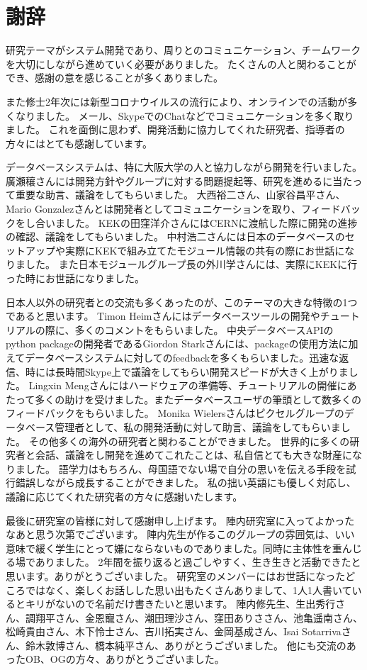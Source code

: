 
%
%
\chapter*{謝辞}
研究テーマがシステム開発であり、周りとのコミュニケーション、チームワークを大切にしながら進めていく必要がありました。
たくさんの人と関わることができ、感謝の意を感じることが多くありました。

また修士2年次には新型コロナウイルスの流行により、オンラインでの活動が多くなりました。
メール、SkypeでのChatなどでコミュニケーションを多く取りました。
これを面倒に思わず、開発活動に協力してくれた研究者、指導者の方々にはとても感謝しています。

データベースシステムは、特に大阪大学の人と協力しながら開発を行いました。
廣瀬穰さんには開発方針やグループに対する問題提起等、研究を進めるに当たって重要な助言、議論をしてもらいました。
大西裕二さん、山家谷昌平さん、Mario Gonzalezさんとは開発者としてコミュニケーションを取り、フィードバックをし合いました。
KEKの田窪洋介さんにはCERNに渡航した際に開発の進捗の確認、議論をしてもらいました。
中村浩二さんには日本のデータベースのセットアップや実際にKEKで組み立てたモジュール情報の共有の際にお世話になりました。
また日本モジュールグループ長の外川学さんには、実際にKEKに行った時にお世話になりました。

日本人以外の研究者との交流も多くあったのが、このテーマの大きな特徴の1つであると思います。
Timon Heimさんにはデータベースツールの開発やチュートリアルの際に、多くのコメントをもらいました。
中央データベースAPIのpython packageの開発者であるGiordon Starkさんには、packageの使用方法に加えてデータベースシステムに対してのfeedbackを多くもらいました。迅速な返信、時には長時間Skype上で議論をしてもらい開発スピードが大きく上がりました。
Lingxin Mengさんにはハードウェアの準備等、チュートリアルの開催にあたって多くの助けを受けました。またデータベースユーザの筆頭として数多くのフィードバックをもらいました。
Monika Wielersさんはピクセルグループのデータベース管理者として、私の開発活動に対して助言、議論をしてもらいました。
その他多くの海外の研究者と関わることができました。
世界的に多くの研究者と会話、議論をし開発を進めてこれたことは、私自信とても大きな財産になりました。
語学力はもちろん、母国語でない場で自分の思いを伝える手段を試行錯誤しながら成長することができました。
私の拙い英語にも優しく対応し、議論に応じてくれた研究者の方々に感謝いたします。

最後に研究室の皆様に対して感謝申し上げます。
陣内研究室に入ってよかったなあと思う次第でございます。
陣内先生が作るこのグループの雰囲気は、いい意味で緩く学生にとって嫌にならないものでありました。同時に主体性を重んじる場でありました。
2年間を振り返ると過ごしやすく、生き生きと活動できたと思います。ありがとうございました。
研究室のメンバーにはお世話になったどころではなく、楽しくお話しした思い出もたくさんありまして、1人1人書いているとキリがないので名前だけ書きたいと思います。
陣内修先生、生出秀行さん、調翔平さん、金恩寵さん、潮田理沙さん、窪田ありささん、池亀遥南さん、松崎貴由さん、木下怜士さん、吉川拓実さん、金岡基成さん、Isai Sotarrivaさん、鈴木敦博さん、橋本純平さん、ありがとうございました。
他にも交流のあったOB、OGの方々、ありがとうございました。


%
%
\listoffigures
\listoftables

\newpage
\printindex
%
%

